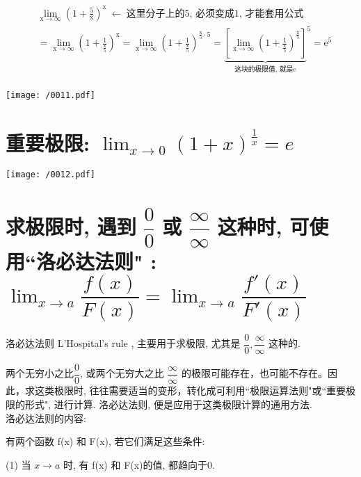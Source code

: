 \documentclass[UTF8]{ctexart}
\begin{document}
\begin{myEnvSample}
	\begin{align*}  %
		&\lim_{\text{x}\rightarrow \infty}\left( 1+\frac{5}{\text{x}} \right) ^{\text{x}}\ \gets \ \text{这里分子上的5,\ 必须变成1,\ 才能套用公式}\\
		&=\lim_{\text{x}\rightarrow \infty}\left( 1+\frac{1}{\frac{\text{x}}{5}} \right) ^{\text{x}}=\lim_{\text{x}\rightarrow \infty}\left( 1+\frac{1}{\frac{\text{x}}{5}} \right) ^{\frac{\text{x}}{5}\cdot 5}=\underset{\text{这块的极限值,\ 就是e}}{\underbrace{\left[ \lim_{\text{x}\rightarrow \infty}\left( 1+\frac{1}{\frac{\text{x}}{5}} \right) ^{\frac{\text{x}}{5}} \right] }}^5=\text{e}^5\\
	\end{align*}
	
	\texttt{[image: /0011.pdf]}
\end{myEnvSample}





\section{重要极限: $ \boxed{\lim_{x \to 0} (1+x)^{\frac{1} {x}} =e} $}

\texttt{[image: /0012.pdf]}





\section{求极限时, 遇到 $ \dfrac{0}{0}$ 或 $\dfrac{\infty} {\infty}$ 这种时, 可使用``洛必达法则" : 
	$ \boxed{	\lim_{x → a}\dfrac{f(x)}{F(x)}=\lim_{x\rightarrow a}\dfrac{f'(x)}{F'(x)}}$}

洛必达法则  L'Hospital's rule , 主要用于求极限, 尤其是 $ \dfrac{0}{0}, \dfrac{\infty} {\infty}$ 这种的.

两个无穷小之比$ \dfrac{0}{0}$, 或两个无穷大之比 $\dfrac{\infty} {\infty}$ 的极限可能存在，也可能不存在。因此，求这类极限时, 往往需要适当的变形，转化成可利用``极限运算法则"或``重要极限的形式", 进行计算. 洛必达法则, 便是应用于这类极限计算的通用方法. \\

洛必达法则的内容: 

有两个函数 f(x) 和 F(x), 若它们满足这些条件:

(1) 当 $x \to a$ 时, 有 f(x) 和 F(x)的值, 都趋向于0.
\end{document}
